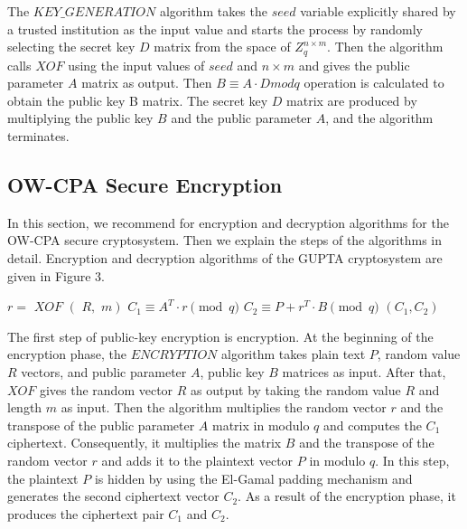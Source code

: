 \documentclass[a4paper,fleqn]{cas-dc}
\begin{document}
	The $ KEY\_GENERATION $ algorithm takes the $ seed $ variable explicitly shared by a trusted institution as the input value and starts the process by randomly selecting the secret key $ D $ matrix from the space of $Z_q^{n \times m}$. Then the algorithm calls $ XOF $ using the input values of $ seed $ and $ n \times m $ and gives the public parameter $ A $ matrix as output. Then $B \equiv A \cdot D mod q$ operation is calculated to obtain the public key B matrix. The secret key $ D $ matrix are produced by multiplying the public key $ B $ and the public parameter $ A $, and the algorithm terminates.




\subsection{OW-CPA Secure Encryption}

	In this section, we recommend for encryption and decryption algorithms for the OW-CPA secure cryptosystem. Then we explain the steps of the algorithms in detail. Encryption and decryption algorithms of the GUPTA cryptosystem are given in Figure 3.

	\begin{algorithm}
			\begin{algorithmic}
				\State $ r = \textit{ XOF } (\textit{ R}, \textit{ m}) $
				\State $ C_1 \equiv A^T \cdot r \pmod q $
				\State $ C_2 \equiv P + r^T \cdot B \pmod q $ 
				\State \Return $ (C_1, C_2) $ 
				\EndProcedure 
			\end{algorithmic}
		\label{Algorithm:2}
	\end{algorithm}

	The first step of public-key encryption is encryption. At the beginning of the encryption phase, the $ ENCRYPTION $ algorithm takes plain text $ P $, random value $ R $ vectors, and public parameter $ A $, public key $ B $ matrices as input. After that, $ XOF $ gives the random vector $ R $ as output by taking the random value $ R $ and length $ m $ as input. Then the algorithm multiplies the random vector $ r $ and the transpose of the public parameter $ A $ matrix in modulo $ q $ and computes the $ C_1 $ ciphertext. Consequently, it multiplies the matrix $ B $ and the transpose of the random vector $ r  $ and adds it to the plaintext vector $ P $ in modulo $ q $. In this step, the plaintext $ P $ is hidden by using the El-Gamal padding mechanism and generates the second ciphertext vector $ C_2 $. As a result of the encryption phase, it produces the ciphertext pair $ C_1 $ and $ C_2 $.
\end{document}
